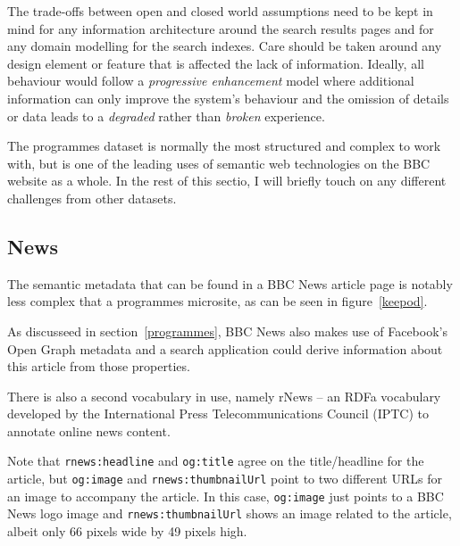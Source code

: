 The trade-offs between open and closed world assumptions need to
be kept in mind for any information architecture around the
search results pages and for any domain modelling for the
search indexes. Care should be taken around any design element
or feature that is affected the lack of information. Ideally,
all behaviour would follow a \emph{progressive enhancement} model
where additional information can only improve the system's
behaviour
and the omission of details or data leads to a \emph{degraded}
rather than \emph{broken} experience.

The programmes dataset is normally the most structured and
complex to work with, but is one of the leading uses of
semantic web technologies on the BBC website as a whole. In
the rest of this sectio, I will briefly touch on any different
challenges from other datasets.

\subsection{News}

The semantic metadata that can be found in a BBC News article
page is notably less complex that a programmes microsite, as
can be seen in figure~\ref{keepod}.

\begin{sidewaysfigure}
  \begin{center}
    \begin{dot2tex}[dot,pgf,scale=0.41]
      
    \end{dot2tex}
  \end{center}
  \caption{Metadata found within a BBC News article page}
  \label{keepod}
\end{sidewaysfigure}

As discusseed in section~\ref{programmes}, BBC News also makes
use of Facebook's Open Graph metadata and a search application
could derive information about this article from those properties.

There is also a second vocabulary in use, namely rNews -- an RDFa
vocabulary developed by the International Press Telecommunications Council
(IPTC) to annotate online news content.

Note that \texttt{rnews:headline} and \texttt{og:title} agree on
the title/headline for the article, but \texttt{og:image} and
\texttt{rnews:thumbnailUrl} point to two different URLs for
an image to accompany the article. In this case, \texttt{og:image}
just points to a BBC News logo image and \texttt{rnews:thumbnailUrl}
shows an image related to the article, albeit only 66 pixels wide
by 49 pixels high.

